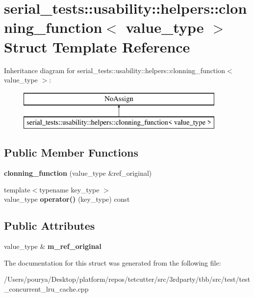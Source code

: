 \hypertarget{structserial__tests_1_1usability_1_1helpers_1_1clonning__function}{}\section{serial\+\_\+tests\+:\+:usability\+:\+:helpers\+:\+:clonning\+\_\+function$<$ value\+\_\+type $>$ Struct Template Reference}
\label{structserial__tests_1_1usability_1_1helpers_1_1clonning__function}
Inheritance diagram for serial\+\_\+tests\+:\+:usability\+:\+:helpers\+:\+:clonning\+\_\+function$<$ value\+\_\+type $>$\+:\begin{figure}[H]
\begin{center}
\leavevmode
\includegraphics[height=2.000000cm]{structserial__tests_1_1usability_1_1helpers_1_1clonning__function}
\end{center}
\end{figure}
\subsection*{Public Member Functions}
\begin{DoxyCompactItemize}
\item 
\hypertarget{structserial__tests_1_1usability_1_1helpers_1_1clonning__function_af4f5aa025e282edfe72bf02e6bf77678}{}{\bfseries clonning\+\_\+function} (value\+\_\+type \&ref\+\_\+original)\label{structserial__tests_1_1usability_1_1helpers_1_1clonning__function_af4f5aa025e282edfe72bf02e6bf77678}

\item 
\hypertarget{structserial__tests_1_1usability_1_1helpers_1_1clonning__function_a574dc84b0d8d5d13f0ba02601e78663c}{}{\footnotesize template$<$typename key\+\_\+type $>$ }\\value\+\_\+type {\bfseries operator()} (key\+\_\+type) const \label{structserial__tests_1_1usability_1_1helpers_1_1clonning__function_a574dc84b0d8d5d13f0ba02601e78663c}

\end{DoxyCompactItemize}
\subsection*{Public Attributes}
\begin{DoxyCompactItemize}
\item 
\hypertarget{structserial__tests_1_1usability_1_1helpers_1_1clonning__function_a61360dd15f2da999fc5859a989c9abbd}{}value\+\_\+type \& {\bfseries m\+\_\+ref\+\_\+original}\label{structserial__tests_1_1usability_1_1helpers_1_1clonning__function_a61360dd15f2da999fc5859a989c9abbd}

\end{DoxyCompactItemize}


The documentation for this struct was generated from the following file\+:\begin{DoxyCompactItemize}
\item 
/\+Users/pourya/\+Desktop/platform/repos/tetcutter/src/3rdparty/tbb/src/test/test\+\_\+concurrent\+\_\+lru\+\_\+cache.\+cpp\end{DoxyCompactItemize}
